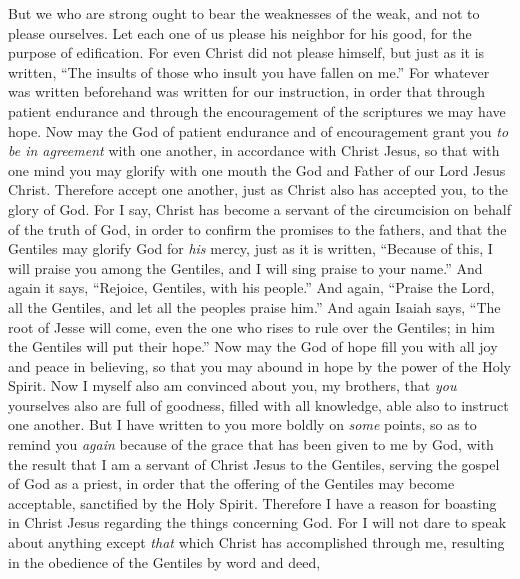 
\begin{biblechapter} %
 But we who are strong ought to bear the weaknesses of the weak, and not to please ourselves.
\verse Let each one of us please his neighbor for his good, for the purpose of edification.
\verse For even Christ did not please himself, but just as it is written, “The insults of those who insult you have fallen on me.”
\verse For whatever was written beforehand was written for our instruction, in order that through patient endurance and through the encouragement of the scriptures we may have hope.
\verse Now may the God of patient endurance and of encouragement grant you \textit{to be in agreement} with one another, in accordance with Christ Jesus,
\verse so that with one mind you may glorify with one mouth the God and Father of our Lord Jesus Christ.
\verse Therefore accept one another, just as Christ also has accepted you, to the glory of God.
\verse For I say, Christ has become a servant of the circumcision on behalf of the truth of God, in order to confirm the promises to the fathers,
\verse and that the Gentiles may glorify God for \textit{his} mercy, just as it is written, “Because of this, I will praise you among the Gentiles, 
and I will sing praise to your name.”
\verse And again it says, “Rejoice, Gentiles, with his people.”
\verse And again, “Praise the Lord, all the Gentiles, 
and let all the peoples praise him.”
\verse And again Isaiah says, “The root of Jesse will come, 
even the one who rises to rule over the Gentiles; 
in him the Gentiles will put their hope.”
\verse Now may the God of hope fill you with all joy and peace in believing, so that you may abound in hope by the power of the Holy Spirit.
 Now I myself also am convinced about you, my brothers, that \textit{you} yourselves also are full of goodness, filled with all knowledge, able also to instruct one another.
\verse But I have written to you more boldly on \textit{some} points, so as to remind you \textit{again} because of the grace that has been given to me by God,
\verse with the result that I am a servant of Christ Jesus to the Gentiles, serving the gospel of God as a priest, in order that the offering of the Gentiles may become acceptable, sanctified by the Holy Spirit.
\verse Therefore I have a reason for boasting in Christ Jesus regarding the things concerning God.
\verse For I will not dare to speak about anything except \textit{that} which Christ has accomplished through me, resulting in the obedience of the Gentiles by word and deed,

\end{biblechapter}

